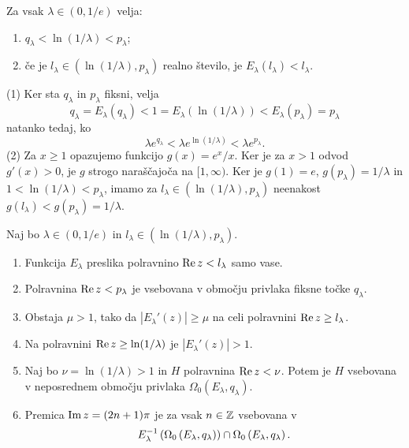 \begin{lema} \label{lem:enadva}
    Za vsak \(\lambda \in (0, 1/e)\) velja:
    \begin{enumerate}[label=(\arabic*)]
        \item \(q_\lambda < \ln (1 / \lambda) < p_\lambda\);
        \item če je \(l_\lambda \in (\ln (1 / \lambda), p_\lambda)\) realno število, je \(E_\lambda (l_\lambda) < l_\lambda\).
    \end{enumerate}
\end{lema}

\begin{dokaz}
    (1) Ker sta \(q_\lambda\) in \(p_\lambda\) fiksni, velja
    \[q_\lambda = E_\lambda (q_\lambda) < 1 = E_\lambda (\ln (1 / \lambda)) < E_\lambda (p_\lambda) = p_\lambda\]
    natanko tedaj, ko
    \[\lambda e^{q_\lambda} < \lambda e^{\ln (1 / \lambda)} < \lambda e^{p_\lambda}.\]
    (2) Za \(x \geq 1\) opazujemo funkcijo \(g (x) = e^x / x\). Ker je za \(x > 1\) odvod \(g' (x) > 0\), je \(g\) strogo naraščajoča na \([1, \infty)\). Ker je \(g (1) = e\), \(g (p_\lambda) = 1 / \lambda\) in \(1 < \ln (1 / \lambda) < p_\lambda\), imamo za \(l_\lambda \in (\ln (1 / \lambda), p_\lambda)\) neenakost \(g (l_\lambda) < g (p_\lambda) = 1 / \lambda\).
\end{dokaz}

\begin{trditev} \label{prop:trinajst}
    Naj bo \(\lambda \in (0, 1/e)\) in \(l_\lambda \in (\ln (1 / \lambda), p_\lambda)\).
    \begin{enumerate}[label=(\arabic*)]
        \item Funkcija \(E_\lambda\) preslika polravnino \(\operatorname{Re} z < l_\lambda\) samo vase.
        \item Polravnina \(\operatorname{Re} z < p_\lambda\) je vsebovana v območju privlaka fiksne točke \(q_\lambda\).
        \item Obstaja \(\mu > 1\), tako da \(|E_\lambda' (z)| \geq \mu\) na celi polravnini \(\operatorname{Re} z \geq l_\lambda\).
        \item Na polravnini \(\operatorname{Re} z \geq \ln (1 / \lambda)\) je \(|E_\lambda' (z)| > 1\).
        \item Naj bo \(\nu = \ln (1 / \lambda) > 1\) in \(H\) polravnina \(\operatorname{Re} z < \nu\). Potem je \(H\) vsebovana v neposrednem območju privlaka \(\Omega_0 (E_\lambda, q_\lambda)\).
        \item Premica \(\operatorname{Im} z = (2n + 1) \pi\) je za vsak \(n \in \mathbb Z\) vsebovana v
              \[E_\lambda^{-1} \left( \Omega_0 \left( E_\lambda, q_\lambda \right) \right) \cap \Omega_0 \left( E_\lambda, q_\lambda \right).\]
    \end{enumerate}
\end{trditev}

